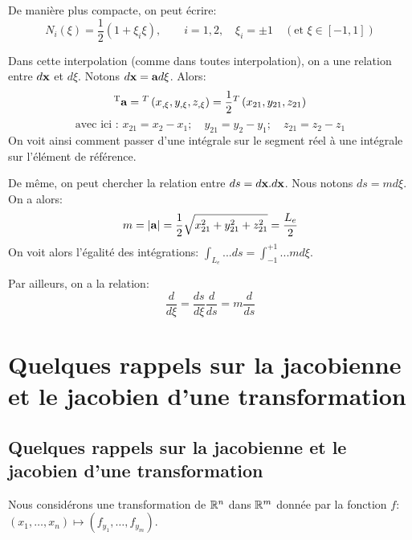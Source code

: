 De manière plus \og compacte\fg{}, on peut écrire:
\begin{equation} N_i(\xi)=\frac12(1+\xi_i\xi), \qquad i=1,2, \quad \xi_i=\pm1 \quad (\text{et } \xi\in[-1,1]) \end{equation}

\medskip
Dans cette interpolation (comme dans toutes interpolation), on a une relation entre $d\mathbf{x}$ et
$d\xi$. Notons $d\mathbf{x} = \mathbf{a} d\xi$. Alors:
\begin{equation} {}^\mathrm{T}\mathbf{a} = {}^T\left( x_{,\xi}, y_{,\xi}, z_{,\xi}\right) = \frac12 {}^T\left( x_{21}, y_{21}, z_{21}\right)\end{equation}
\begin{equation}\text{avec ici : } x_{21}=x_2-x_1; \quad y_{21}=y_2-y_1; \quad z_{21}=z_2-z_1 \end{equation}
On voit ainsi comment passer d'une intégrale sur le segment réel à une intégrale
sur l'élément de référence.

\medskip
De même, on peut chercher la relation entre $ds=d\mathbf{x}.d\mathbf{x}$. Nous notons
$ds=m d\xi$. On a alors: 
\begin{equation}m=|\mathbf{a}| = \frac12 \sqrt{x_{21}^2+y_{21}^2+z_{21}^2} = \frac{L_e}2 \end{equation}
On voit alors l'égalité des intégrations: $\int_{L_e} ... ds = \int_{-1}^{+1} ... m d\xi$.

\medskip
Par ailleurs, on a la relation:
\begin{equation} \frac{d}{d\xi} = \frac{ds}{d\xi}\frac{d}{ds}=m\frac{d}{ds}\end{equation}





\medskip
\ifVersionAvecExemplesSepares
   \section{Quelques rappels sur la jacobienne et le jacobien d'une transformation}
\else
   \subsection{Quelques rappels sur la jacobienne et le jacobien d'une transformation}
\fi

Nous considérons une transformation de $\mathbb R^n$ dans $\mathbb R^m$ donnée par la fonction $f$: 
$\left(x_1, \ldots, x_n \right) \mapsto \left(f_{y_1}, \ldots, f_{y_m} \right)$.

